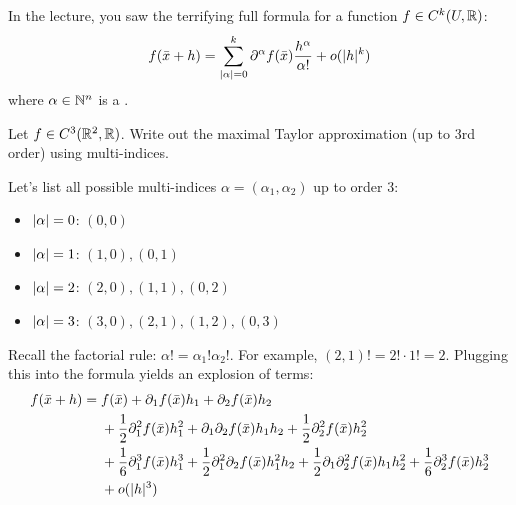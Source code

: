 In the lecture, you saw the terrifying full formula for a function $f \in C^k(U, \mathbb{R})$:
\[ f(\bar{x} + h) = \sum_{\lvert\alpha\rvert=0}^k \partial^\alpha f(\bar{x}) \frac{h^\alpha}{\alpha!} + o(\lvert h\rvert^k) \]
where $\alpha \in \mathbb{N}^n$ is a .


\begin{exercise*}
Let $f \in C^3(\mathbb{R}^2, \mathbb{R})$. Write out the maximal Taylor approximation (up to 3rd order) using multi-indices.
\end{exercise*}

\begin{solution}
Let's list all possible multi-indices $\alpha = (\alpha_1, \alpha_2)$ up to order 3:
\begin{itemize}
    \item $\lvert\alpha\rvert=0$: $(0,0)$
    \item $\lvert\alpha\rvert=1$: $(1,0), (0,1)$
    \item $\lvert\alpha\rvert=2$: $(2,0), (1,1), (0,2)$
    \item $\lvert\alpha\rvert=3$: $(3,0), (2,1), (1,2), (0,3)$
\end{itemize}
Recall the factorial rule: $\alpha! = \alpha_1! \alpha_2!$. For example, $(2,1)! = 2! \cdot 1! = 2$.
Plugging this into the formula yields an explosion of terms:
\begin{equation}
    \begin{aligned}
        f(\bar{x}+h) = \;&f(\bar{x}) + \partial_1 f(\bar{x})h_1 + \partial_2 f(\bar{x})h_2 \\
        &+ \frac{1}{2}\partial_1^2 f(\bar{x})h_1^2 + \partial_1 \partial_2 f(\bar{x})h_1 h_2 + \frac{1}{2}\partial_2^2 f(\bar{x})h_2^2 \\
        &+ \frac{1}{6}\partial_1^3 f(\bar{x})h_1^3 + \frac{1}{2}\partial_1^2 \partial_2 f(\bar{x})h_1^2 h_2 + \frac{1}{2}\partial_1 \partial_2^2 f(\bar{x})h_1 h_2^2 + \frac{1}{6}\partial_2^3 f(\bar{x})h_2^3 \\
        &+ o(\lvert h\rvert^3)
    \end{aligned}
\end{equation}
\end{solution}

